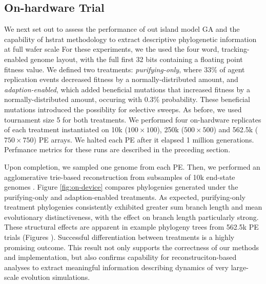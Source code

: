 \subsection{On-hardware Trial}



We next set out to assess the performance of out island model GA and the capability of hstrat methodology to extract descriptive phylogenetic information at full wafer scale
For these experiments, we the used the four word, tracking-enabled genome layout, with the full first 32 bits containing a floating point fitness value.
We defined two treatments: \textit{purifying-only}, where 33\% of agent replication events decreased fitness by a normally-distributed amount,  and \textit{adaption-enabled}, which added beneficial mutations that increased fitness by a normally-distributed amount, occuring with 0.3\% probability.
These beneficial mutations introduced the possiblity for selective sweeps.
As before, we used tournament size 5 for both treatments.
We performed four on-hardware replicates of each treatment instantiated on 10k ($100\times100$), 250k ($500\times500$) and 562.5k ($750\times750$) PE arrays.
We halted each PE after it elapsed 1 million generations.
Perfmance metrics for these runs are described in the preceding section.

Upon completion, we sampled one genome from each PE.
Then, we performed an agglomerative trie-based reconstruction from subsamples of 10k end-state genomes \citep{moreno2024analysis}.
Figure \ref{fig:on-device} compares phylogenies generated under the purifying-only and adaption-enabled treatments.
As expected, purifying-only treatment phylogenies consistently exhibited greater sum branch length and mean evolutionary distinctiveness, with the effect on branch length particularly strong.
These structural effects are apparent in example phylogeny trees from 562.5k PE trials (Figures ).
Successful differentiation between treatments is a highly promising outcome.
This result not only supports the correctness of our methods and implementation, but also confirms capability for reconstruciton-based analyses to extract meaningful information describing dynamics of very large-scale evolution simulations.
